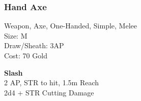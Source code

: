 \subsubsection{Hand Axe}\label{weapon:handAxe}
Weapon, Axe, One-Handed, Simple, Melee\\
Size: M\\
Draw/Sheath: 3AP\\
Cost: 70 Gold

\textbf{Slash}\\
2 AP, STR to hit, 1.5m Reach\\
2d4 + \texttimes STR Cutting Damage

